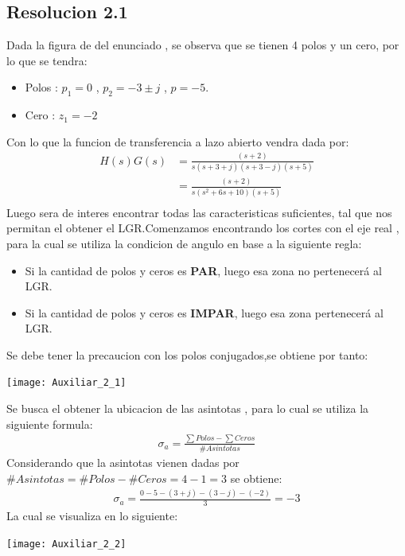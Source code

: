 \documentclass[
  11pt,
  letterpaper,
   addpoints,
   answers
  ]{exam}
\begin{document}
\begin{questions}
\begin{solution}
\subsection*{Resolucion 2.1}
Dada la figura de del enunciado , se observa que se tienen 4 polos y un cero, por lo que se tendra:
\begin{itemize}
    \item Polos : $p_1=0$ , $p_2=-3 \pm j$ , $p=-5$.
    \item Cero : $z_1=-2$
\end{itemize}
Con lo que la funcion de transferencia a lazo abierto vendra dada por:
\begin{align}
    H(s)G(s)&=\frac{(s+2)}{s(s+3+j)(s+3-j)(s+5)}\\
     &=\frac{(s+2)}{s(s^2+6s+10)(s+5)}\\
\end{align}
Luego sera de interes encontrar todas las caracteristicas suficientes, tal que nos permitan el obtener el LGR.Comenzamos encontrando los cortes con el eje real , para la cual se utiliza la condicion de angulo en base a la siguiente regla: 
\begin{itemize}
    \item Si la cantidad de polos y ceros es \textbf{PAR}, luego esa zona no pertenecerá al LGR.
    \item Si la cantidad de polos y ceros es \textbf{IMPAR}, luego esa zona pertenecerá al LGR.
\end{itemize}
Se debe tener la precaucion con los polos conjugados,se obtiene por tanto:
\begin{center}
    \texttt{[image: Auxiliar\_2\_1]}
  \end{center}
Se busca el obtener la ubicacion de las asintotas , para lo cual se utiliza la siguiente formula:
\begin{align}
    \sigma_{a}= \frac{\sum Polos - \sum Ceros}{\# Asintotas} 
\end{align}
Considerando que la asintotas vienen dadas por $\#Asintotas = \#Polos - \#Ceros = 4 - 1 = 3$ se obtiene:
\begin{align}
    \sigma_{a}= \frac{ 0 - 5 -(3 + j) - (3 - j) - (-2)}{3} = -3 
\end{align}
La cual se visualiza en lo siguiente:
\begin{center}
    \texttt{[image: Auxiliar\_2\_2]}
  \end{center}

\end{solution}
\end{questions}
\end{document}
